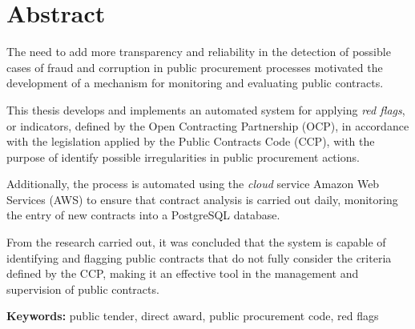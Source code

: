 \chapter*{Abstract}
\label{chap:abstract}

The need to add more transparency and reliability in the detection of possible cases of fraud and corruption in public procurement processes motivated the development of a mechanism for monitoring and evaluating public contracts.

This thesis develops and implements an automated system for applying \textit{red flags}, or indicators, defined by the Open Contracting Partnership (OCP), in accordance with the legislation applied by the Public Contracts Code (CCP), with the purpose of identify possible irregularities in public procurement actions.

Additionally, the process is automated using the \textit{cloud} service Amazon Web Services (AWS) to ensure that contract analysis is carried out daily, monitoring the entry of new contracts into a PostgreSQL database.

From the research carried out, it was concluded that the system is capable of identifying and flagging public contracts that do not fully consider the criteria defined by the CCP, making it an effective tool in the management and supervision of public contracts.

\vspace{2cm}

\textbf{Keywords:} public tender, direct award, public procurement code, red flags
